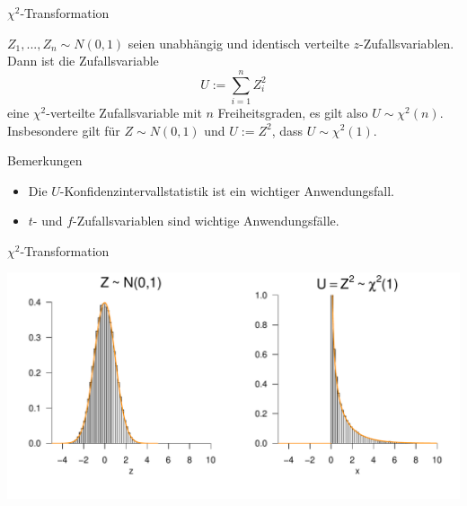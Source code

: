 \documentclass[
  8pt,
  ignorenonframetext,
]{beamer}
\providecommand{\tightlist}{%
  \setlength{\itemsep}{0pt}\setlength{\parskip}{0pt}}
\begin{document}
\begin{frame}{\(\chi^2\)-Transformation}
\protect\hypertarget{chi2-transformation-2}{}
\small
\begin{theorem}
\justifying
\normalfont
$Z_1,...,Z_n \sim N(0,1)$ seien unabhängig und identisch verteilte $z$-Zufallsvariablen.
Dann ist die Zufallsvariable
\begin{equation}
U := \sum_{i=1}^n Z_i^2
\end{equation}
eine $\chi^2$-verteilte Zufallsvariable mit $n$ Freiheitsgraden, es gilt also
$U \sim \chi^2(n)$. Insbesondere gilt für $Z \sim N(0,1)$ und $U := Z^2$, dass
$U \sim \chi^2(1)$.
\end{theorem}

\footnotesize

Bemerkungen

\begin{itemize}
\tightlist
\item
  Die \(U\)-Konfidenzintervallstatistik ist ein wichtiger
  Anwendungsfall.
\item
  \(t\)- und \(f\)-Zufallsvariablen sind wichtige Anwendungsfälle.
\end{itemize}
\end{frame}

\begin{frame}{\(\chi^2\)-Transformation}
\protect\hypertarget{chi2-transformation-3}{}
\vfill
\vspace{5mm}

\begin{center}\includegraphics[width=0.9\linewidth]{8_Abbildungen/wtfi_8_chi2_transform} \end{center}
\vfill
\end{frame}
\end{document}
